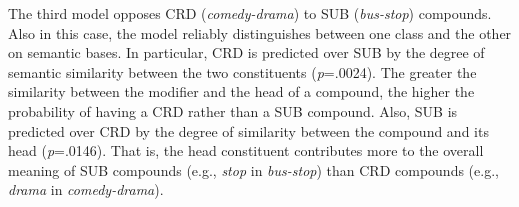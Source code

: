 \documentclass[output=paper]{langsci/langscibook}
\begin{document}
\begin{table}[b]
\caption{Results of the logit model opposing CRD (1) to SUB (0).\label{tab:reascrdsub}
}
\end{table}

The third model opposes CRD (\emph{comedy-drama}) to SUB (\emph{bus-stop}) compounds. Also in this case, the model reliably distinguishes between one class and the other on semantic bases. In particular, CRD is predicted over SUB by the degree of semantic similarity between the two constituents (\emph{p}=.0024). The greater the similarity between the modifier and the head of a compound, the higher the probability of having a CRD rather than a SUB compound. Also, SUB is predicted over CRD by the degree of similarity between the compound and its head (\emph{p}=.0146). That is, the head constituent contributes more to the overall meaning of SUB compounds (e.g., \emph{stop} in \emph{bus-stop}) than CRD compounds (e.g., \emph{drama} in \emph{comedy-drama}).
\end{document}
